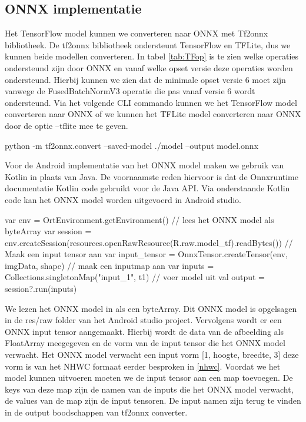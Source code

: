 \subsection{ONNX implementatie} \label{classonnx}
Het TensorFlow model kunnen we converteren naar ONNX met Tf2onnx bibliotheek.
De tf2onnx bibliotheek ondersteunt TensorFlow en TFLite, dus we kunnen beide modellen converteren.
In tabel \ref{tab:TFop} is te zien welke operaties ondersteund zijn door ONNX en vanaf welke opset versie deze operaties worden ondersteund.
Hierbij kunnen we zien dat de minimale opset versie 6 moet zijn vanwege de FusedBatchNormV3 operatie die pas vanaf versie 6 wordt ondersteund.
Via het volgende CLI commando kunnen we het TensorFlow model converteren naar ONNX of we kunnen het TFLite model converteren naar ONNX door de optie --tflite mee te geven.

\begin{python}
python -m tf2onnx.convert --saved-model ./model --output model.onnx
\end{python}

Voor de Android implementatie van het ONNX model maken we gebruik van Kotlin in plaats van Java.
De voornaamste reden hiervoor is dat de Onnxruntime documentatie Kotlin code gebruikt voor de Java API.
Via onderstaande Kotlin code kan het ONNX model worden uitgevoerd in Android studio.

\begin{python} 
var env = OrtEnvironment.getEnvironment()
// lees het ONNX model als byteArray
var session = env.createSession(resources.openRawResource(R.raw.model_tf).readBytes())
// Maak een input tensor aan
var input_tensor = OnnxTensor.createTensor(env, imgData, shape)
// maak een inputmap aan
var inputs = Collections.singletonMap("input_1", t1)
// voer model uit
val output = session?.run(inputs)
\end{python}

We lezen het ONNX model in als een byteArray.
Dit ONNX model is opgelsagen in de res/raw folder van het Android studio project.
Vervolgens wordt er een ONNX input tensor aangemaakt.
Hierbij wordt de data van de afbeelding als FloatArray meegegeven en de vorm van de input tensor die het ONNX model verwacht.
Het ONNX model verwacht een input vorm [1, hoogte, breedte, 3] deze vorm is van het NHWC formaat eerder besproken in \ref{nhwc}.
Voordat we het model kunnen uitvoeren moeten we de input tensor aan een map toevoegen.
De keys van deze map zijn de namen van de inputs die het ONNX model verwacht, de values van de map zijn de input tensoren.
De input namen zijn terug te vinden in de output boodschappen van tf2onnx converter.

